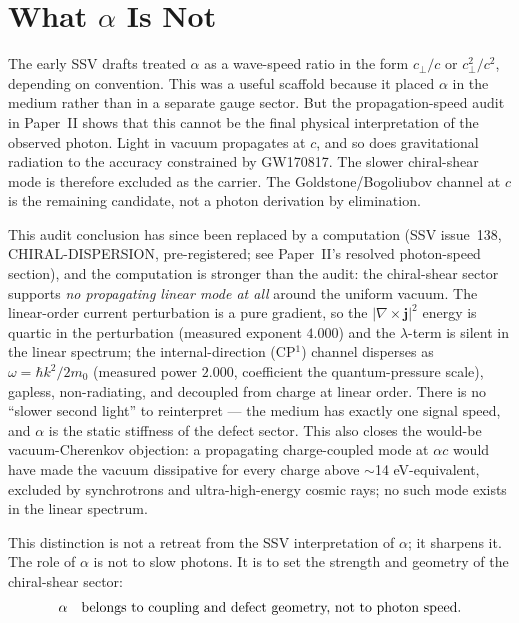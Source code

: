 \documentclass[11pt,a4paper]{article}
\begin{document}
\section{What \texorpdfstring{$\alpha$}{alpha} Is Not}
\label{sec:not}

The early SSV drafts treated $\alpha$ as a wave-speed ratio in the form
$c_\perp/c$ or $c_\perp^2/c^2$, depending on convention.  This was a useful
scaffold because it placed $\alpha$ in the medium rather than in a
separate gauge sector.  But the propagation-speed audit in Paper~II shows
that this cannot be the final physical interpretation of the observed
photon.  Light in vacuum propagates at $c$, and so does gravitational
radiation to the accuracy constrained by GW170817.  The slower
chiral-shear mode is therefore excluded as the carrier.  The
Goldstone/Bogoliubov channel at $c$ is the remaining candidate, not a photon
derivation by elimination.

This audit conclusion has since been replaced by a computation
(SSV issue~138, CHIRAL-DISPERSION, pre-registered; see Paper~II's
resolved photon-speed section), and the computation is stronger than the
audit: the chiral-shear sector supports \emph{no propagating linear mode
at all} around the uniform vacuum.  The linear-order current perturbation
is a pure gradient, so the $|\nabla\times\mathbf{j}|^2$ energy is quartic
in the perturbation (measured exponent $4.000$) and the $\lambda$-term is
silent in the linear spectrum; the internal-direction (CP$^1$) channel
disperses as $\omega=\hbar k^2/2m_0$ (measured power $2.000$, coefficient
the quantum-pressure scale), gapless, non-radiating, and decoupled from
charge at linear order.  There is no ``slower second light'' to
reinterpret --- the medium has exactly one signal speed, and $\alpha$ is
the static stiffness of the defect sector.  This also closes the
would-be vacuum-Cherenkov objection: a propagating charge-coupled mode at
$\alpha c$ would have made the vacuum dissipative for every charge above
$\sim$14 eV-equivalent, excluded by synchrotrons and ultra-high-energy
cosmic rays; no such mode exists in the linear spectrum.

This distinction is not a retreat from the SSV interpretation of
$\alpha$; it sharpens it.  The role of $\alpha$ is not to slow photons.  It
is to set the strength and geometry of the chiral-shear sector:
\begin{equation}
    \alpha
    \quad\hbox{belongs to coupling and defect geometry, not to photon speed.}
    \label{eq:not_speed}
\end{equation}
\end{document}

